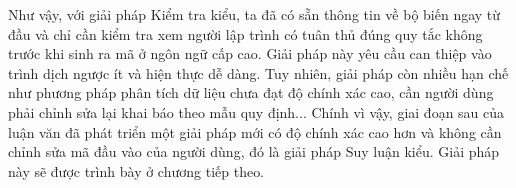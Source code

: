 Như vậy, với giải pháp Kiểm tra kiểu, ta đã có sẵn thông tin về bộ biến ngay từ đầu và chỉ cần kiểm tra xem người lập trình có tuân thủ đúng quy tắc không trước khi sinh ra mã ở ngôn ngữ cấp cao. Giải pháp này yêu cầu can thiệp vào trình dịch ngược ít và hiện thực dễ dàng. Tuy nhiên, giải pháp còn nhiều hạn chế như phương pháp phân tích dữ liệu chưa đạt độ chính xác cao, cần người dùng phải chỉnh sửa lại khai báo theo mẫu quy định... Chính vì vậy, giai đoạn sau của luận văn đã phát triển một giải pháp mới có độ chính xác cao hơn và không cần chỉnh sửa mã đầu vào của người dùng, đó là giải pháp Suy luận kiểu. Giải pháp này sẽ được trình bày ở chương tiếp theo.




